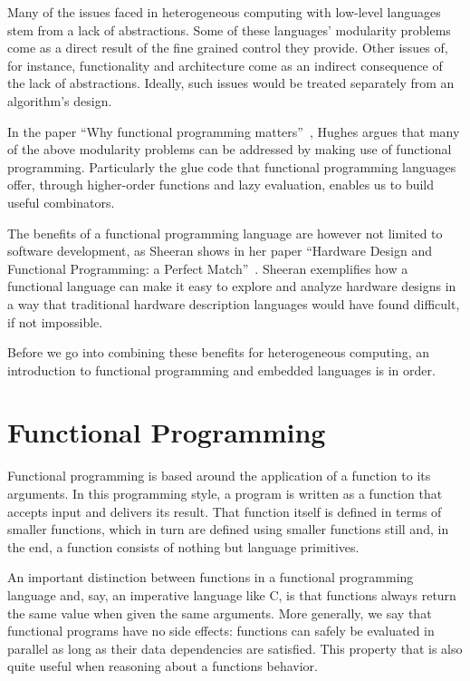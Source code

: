 \documentclass[../paper.tex]{subfiles}
\begin{document}
Many of the issues faced in heterogeneous computing with low-level languages stem from a lack of abstractions. Some of these languages' modularity problems come as a direct result of the fine grained control they provide. Other issues of, for instance, functionality and architecture come as an indirect consequence of the lack of abstractions. Ideally, such issues would be treated separately from an algorithm's design.


In the paper ``Why functional programming matters''~\cite{hughes1989}, Hughes argues that many of the above modularity problems can be addressed by making use of functional programming. Particularly the glue code that functional programming languages offer, through higher-order functions and lazy evaluation, enables us to build useful combinators.

The benefits of a functional programming language are however not limited to software development, as Sheeran shows in her paper ``Hardware Design and Functional Programming: a Perfect Match''~\cite{sheeran2005}. Sheeran exemplifies how a functional language can make it easy to explore and analyze hardware designs in a way that traditional hardware description languages would have found difficult, if not impossible.

Before we go into combining these benefits for heterogeneous computing, an introduction to functional programming and embedded languages is in order.

\section{Functional Programming}
\label{functional}

Functional programming is based around the application of a function to its arguments. In this programming style, a program is written as a function that accepts input and delivers its result. That function itself is defined in terms of smaller functions, which in turn are defined using smaller functions still and, in the end, a function consists of nothing but language primitives.

An important distinction between functions in a functional programming language and, say, an imperative language like C, is that functions always return the same value when given the same arguments. More generally, we say that functional programs have no side effects: functions can safely be evaluated in parallel as long as their data dependencies are satisfied. This property that is also quite useful when reasoning about a functions behavior.
\end{document}
